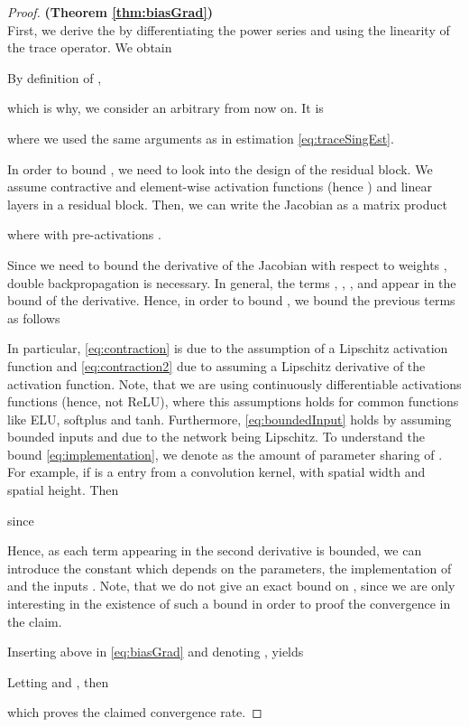 \documentclass{article}
\begin{document}
\begin{proof}\textbf{(Theorem \ref{thm:biasGrad})}\\
First, we derive the by differentiating the power series and using the linearity of the trace operator. We obtain

By definition of , 
    
which is why, we consider an arbitrary  from now on. It is 

where we used the same arguments as in estimation \eqref{eq:traceSingEst}. 

In order to bound , we need to look into the design of the residual block. We assume contractive and element-wise activation functions (hence ) and  linear layers  in a residual block. Then, we can write the Jacobian as a matrix product

where  with pre-activations .

Since we need to bound the derivative of the Jacobian with respect to weights , double backpropagation \citep{doubleBackprop} is necessary. In general, the terms , , ,  and  appear in the bound of the derivative. Hence, in order to bound , we bound the previous terms as follows

In particular, \eqref{eq:contraction} is due to the assumption of a Lipschitz activation function and \eqref{eq:contraction2} due to assuming a Lipschitz derivative of the activation function. Note, that we are using continuously differentiable activations functions (hence, not ReLU), where this assumptions holds for common functions like ELU, softplus and tanh. Furthermore, \eqref{eq:boundedInput} holds by assuming bounded inputs and due to the network being Lipschitz. To understand the bound \eqref{eq:implementation}, we denote  as the amount of parameter sharing of . For example, if  is a entry from a convolution kernel,  with  spatial width and  spatial height. Then
 
 since 
 
Hence, as each term appearing in the second derivative  is bounded, we can introduce the constant  which depends on the parameters, the implementation of  and the inputs . Note, that we do not give an exact bound on , since we are only interesting in the existence of such a bound in order to proof the convergence in the claim.

Inserting above in \eqref{eq:biasGrad} and denoting , yields

Letting  and , then 

which proves the claimed convergence rate.
\end{proof}
\end{document}
